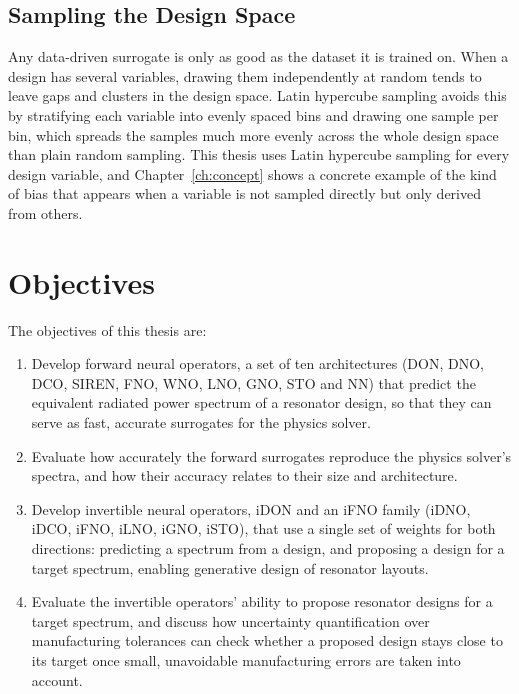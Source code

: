\subsection{Sampling the Design Space}

Any data-driven surrogate is only as good as the dataset it is trained on. When a design has several variables, drawing them independently at random tends to leave gaps and clusters in the design space. Latin hypercube sampling \parencite{mckay1979lhs} avoids this by stratifying each variable into evenly spaced bins and drawing one sample per bin, which spreads the samples much more evenly across the whole design space than plain random sampling. This thesis uses Latin hypercube sampling for every design variable, and Chapter~\ref{ch:concept} shows a concrete example of the kind of bias that appears when a variable is not sampled directly but only derived from others.

\section{Objectives}

The objectives of this thesis are:

\begin{enumerate}
  \item Develop forward neural operators, a set of ten architectures (DON, DNO, DCO, SIREN, FNO, WNO, LNO, GNO, STO and NN) that predict the equivalent radiated power spectrum of a resonator design, so that they can serve as fast, accurate surrogates for the physics solver.
  \item Evaluate how accurately the forward surrogates reproduce the physics solver's spectra, and how their accuracy relates to their size and architecture.
  \item Develop invertible neural operators, iDON and an iFNO family (iDNO, iDCO, iFNO, iLNO, iGNO, iSTO), that use a single set of weights for both directions: predicting a spectrum from a design, and proposing a design for a target spectrum, enabling generative design of resonator layouts.
  \item Evaluate the invertible operators' ability to propose resonator designs for a target spectrum, and discuss how uncertainty quantification over manufacturing tolerances can check whether a proposed design stays close to its target once small, unavoidable manufacturing errors are taken into account.
\end{enumerate}

